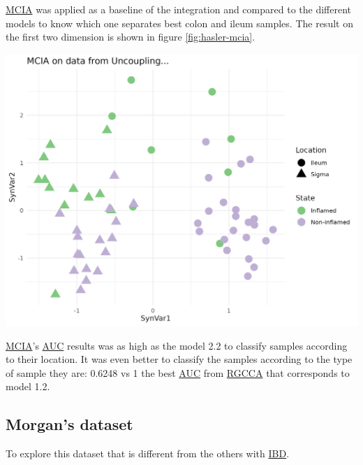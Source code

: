 \documentclass[
  12pt,
  a4paper,
  twoside,
  openright]{book}
\let\origfigure\figure
\let\endorigfigure\endfigure
\renewenvironment{figure}[1][2] {
    \expandafter\origfigure\expandafter[!htbp]
} {
    \endorigfigure
}
\begin{document}
\protect\hyperlink{acronyms_MCIA}{MCIA} was applied as a baseline of the integration and compared to the different models to know which one separates best colon and ileum samples.
The result on the first two dimension is shown in figure \ref{fig:hasler-mcia}.

\begin{figure}
\includegraphics[width=1\linewidth]{images/hasler-mcia} \caption[MCIA dimensions in the Häsler's dataset.]{MCIA dimensions in the Häsler's dataset. MCIA first two dimensions of the dataset shows two vertical groups on the first syntethic dimension according to the location of the samples and colored by the state. Each point represents a sample (colored by location and shape by State).}\label{fig:hasler-mcia}
\end{figure}

\protect\hyperlink{acronyms_MCIA}{MCIA}'s \protect\hyperlink{acronyms_AUC}{AUC} results was as high as the model 2.2 to classify samples according to their location.
It was even better to classify the samples according to the type of sample they are: 0.6248 vs 1 the best \protect\hyperlink{acronyms_AUC}{AUC} from \protect\hyperlink{acronyms_RGCCA}{RGCCA} that corresponds to model 1.2.

\FloatBarrier

\hypertarget{results-morgan}{%
\subsection{Morgan's dataset}\label{results-morgan}}

To explore this dataset that is different from the others with \protect\hyperlink{acronyms_IBD}{IBD}.
\end{document}
